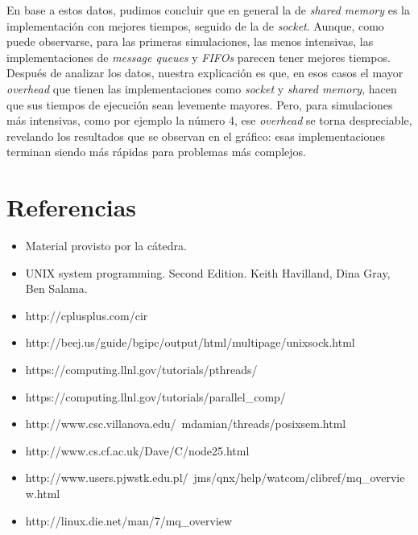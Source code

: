 \documentclass[a4paper,10pt]{article}
\begin{document}
En base a estos datos, pudimos concluir que en general la de \textit{shared memory} es la implementación con mejores tiempos, seguido de la de \textit{socket}. 
Aunque, como puede observarse, para las primeras simulaciones, las menos intensivas, las implementaciones de \textit{message queues} y \textit{FIFOs} parecen 
tener mejores tiempos. Después de analizar los datos, nuestra explicación es que, en esos casos el mayor \textit{overhead} que tienen las implementaciones como 
\textit{socket} y \textit{shared memory}, hacen que sus tiempos de ejecución sean levemente mayores. 
Pero, para simulaciones más intensivas, como por ejemplo la número 4, ese \textit{overhead} se torna despreciable, revelando los resultados que se observan en 
el gráfico: esas implementaciones terminan siendo más rápidas para problemas más complejos.\\

\newpage     
\section{Referencias}

\begin{itemize}
  \item Material provisto por la cátedra.
  \item UNIX system programming. Second Edition. Keith Havilland, Dina Gray, Ben Salama.
  \item http://cplusplus.com/cir
  \item http://beej.us/guide/bgipc/output/html/multipage/unixsock.html
  \item https://computing.llnl.gov/tutorials/pthreads/
  \item https://computing.llnl.gov/tutorials/parallel\_comp/
  \item http://www.csc.villanova.edu/~mdamian/threads/posixsem.html
  \item http://www.cs.cf.ac.uk/Dave/C/node25.html
  \item http://www.users.pjwstk.edu.pl/~jms/qnx/help/watcom/clibref/mq\_overview.html
  \item http://linux.die.net/man/7/mq\_overview
\end{itemize}
   
\end{document}

